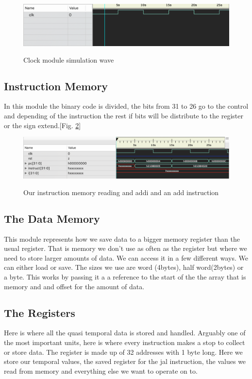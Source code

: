 \documentclass[conference]{IEEEtran}
\begin{document}
    \begin{figure}[h]
        \caption{Clock module simulation wave}
        \centering
        \includegraphics[scale=0.35]{images/clock-module.png}
        \label{fig:clock-wave}
    \end{figure}

    \subsection{Instruction Memory}
    In this module the binary code is divided, the bits from 31 to 26 go to the control and depending of the instruction the rest if bits will be distribute to the register or the sign extend.[Fig. \ref{fig:ins-mem}]
    
    \begin{figure}[h]
        \caption{Our instruction memory reading and addi and an add instruction}
        \centering
        \includegraphics[scale=0.30]{images/instruction-memory.png}
        \label{fig:ins-mem}
    \end{figure}
    
    \subsection{The Data Memory}
    This module represents how we save data to a bigger memory register than the usual register. That is memory we don't use as often as the register but where we need to store larger amounts of data. We can access it in a few different ways. We can either load or save. The sizes we use are word (4bytes), half word(2bytes) or a byte. This works by passing it a a reference to the start of the the array that is memory and and offset for the amount of data.
    
    \subsection{The Registers}
    Here is where all the quasi temporal data is stored and handled. Arguably one of the most important units, here is where every instruction makes a stop to collect or store data. The register is made up of 32 addresses with 1 byte long. Here we store our temporal values, the saved register for the jal instruction, the values we read from memory and everything else we want to operate on to. 
    
\end{document}
